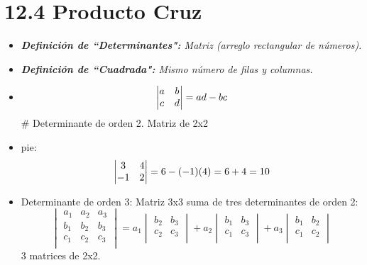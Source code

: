 \section{12.4 Producto Cruz}
\begin{itemize}
    \item \emph{\textbf{Definición de ``Determinantes":} Matriz (arreglo rectangular de números).}
    \item \emph{\textbf{Definición de ``Cuadrada":} Mismo número de filas y columnas. }
    \item \begin{equation*}
        \begin{vmatrix}
            a & b \\ 
            c & d \\ 
        \end{vmatrix}
        = ad - bc \\ 
    \end{equation*}
    \# Determinante de orden 2. Matriz de 2x2 
    
    \item pie:
        \begin{equation*}
            \begin{vmatrix}
                3 & 4 \\ 
                -1 & 2 \\ 
            \end{vmatrix}
            = 6 - (-1) (4) = 6 + 4 = 10 \\ 
        \end{equation*}
    
    \item Determinante de orden 3: Matriz 3x3 suma de tres determinantes de orden 2:
        \begin{equation*}
            \begin{vmatrix}
                a_{1} & a_{2} & a_{3} \\ 
                b_{1} & b_{2} & b_{3} \\ 
                c_{1} & c_{2} & c_{3} \\ 
            \end{vmatrix}
            = a_{1}\begin{vmatrix}
                b_{2} & b_{3} \\ 
                c_{2} & c_{3} \\ 
            \end{vmatrix} + a_{2}
            \begin{vmatrix}
                b_1 &  b_3 \\ 
                c_1 & c_3 \\  
            \end{vmatrix} + a_3 \begin{vmatrix}
                b_1 & b_2 \\ 
                c_1 & c_2 \\ 
            \end{vmatrix}
        \end{equation*}
        3 matrices de 2x2.
    

\end{itemize}
